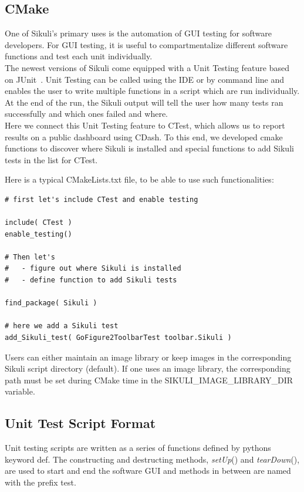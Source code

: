\documentclass{InsightArticle}
\begin{document}
\subsection{CMake}

One of Sikuli's primary uses is the automation of GUI testing for software
developers. For GUI testing, it is useful to compartmentalize different software
functions and test each unit individually.\\

The newest versions of Sikuli come equipped with a Unit Testing feature based
on JUnit~\cite{JUnit:Website}. Unit Testing can be called using the IDE or by
command line and enables the user to write multiple functions in a script which
are run individually. At the end of the run, the Sikuli output will tell the
user how many tests ran successfully and which ones failed and where.\\

Here we connect this Unit Testing feature to CTest, which allows us to report
results on a public dashboard using CDash. To this end, we developed cmake
functions to discover where Sikuli is installed and special functions to add
Sikuli tests in the list for CTest.

Here is a typical CMakeLists.txt file, to be able to use such functionalities:

\begin{verbatim}
# first let's include CTest and enable testing

include( CTest )
enable_testing()

# Then let's
#   - figure out where Sikuli is installed
#   - define function to add Sikuli tests

find_package( Sikuli )

# here we add a Sikuli test
add_Sikuli_test( GoFigure2ToolbarTest toolbar.Sikuli )
\end{verbatim}

Users can either maintain an image library or keep images in the
corresponding Sikuli script directory (default). If one uses an image library,
the corresponding path must be set during CMake time in
the SIKULI\_IMAGE\_LIBRARY\_DIR variable.

\subsection{Unit Test Script Format}

Unit testing scripts are written as a series of functions defined by pythons
keyword def.  The constructing and destructing methods,
\emph{setUp}() and \emph{tearDown}(), are used to start and end the software
GUI and methods in between are named with the prefix test.
\end{document}
